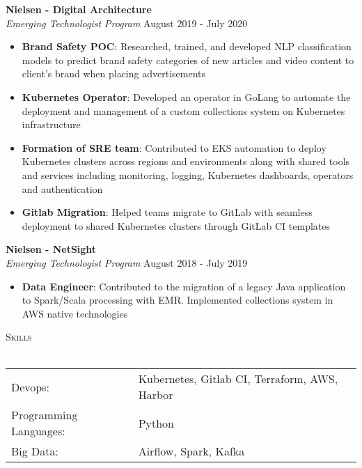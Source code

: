 \documentclass[a4paper]{article}
\newcommand{\lineunder} {
    \vspace*{-8pt} \\
    \hspace*{-18pt} \hrulefill \\
}
\newcommand{\header} [1] {
    {\hspace*{-18pt}\vspace*{6pt} \textsc{#1}}
    \vspace*{-6pt} \lineunder
}
\begin{document}
\textbf{Nielsen - Digital Architecture}\\
\textit{Emerging Technologist Program} \hfill August 2019 - July 2020\\
\vspace{-1mm}
\begin{itemize} \itemsep 1pt
	\item \textbf{Brand Safety POC}: Researched, trained, and developed NLP classification models to predict brand safety categories of new articles and video content to client's brand when placing advertisements
    \item \textbf{Kubernetes Operator}: Developed an operator in GoLang to automate the deployment and management of a custom collections system on Kubernetes infrastructure
    \item \textbf{Formation of SRE team}: Contributed to EKS automation to deploy Kubernetes clusters across regions and environments along with shared tools and services including monitoring, logging, Kubernetes dashboards, operators and authentication
    \item \textbf{Gitlab Migration}: Helped teams migrate to GitLab with seamless deployment to shared Kubernetes clusters through GitLab CI templates
\end{itemize}

\textbf{Nielsen - NetSight}\\
\textit{Emerging Technologist Program} \hfill August 2018 - July 2019\\
\vspace{-1mm}
\begin{itemize} \itemsep 1pt
	\item \textbf{Data Engineer}: Contributed to the migration of a legacy Java application to Spark/Scala processing with EMR. Implemented collections system in AWS native technologies
\end{itemize}

\header{Skills}
\begin{tabular}{ l l }
	Devops:                & Kubernetes, Gitlab CI, Terraform, AWS, Harbor \\
	Programming Languages: & Python                                        \\
	Big Data:              & Airflow, Spark, Kafka                         \\
\end{tabular}
\vspace{3mm}
\end{document}
